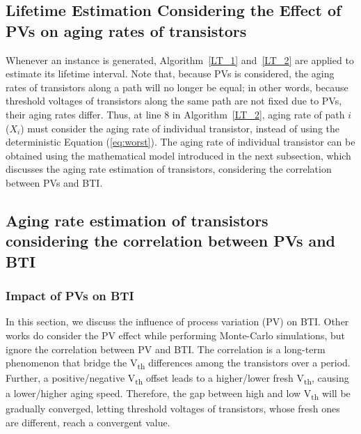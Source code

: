 \subsection{Lifetime Estimation Considering the Effect of PVs on aging rates of transistors}
\label{sec:ins:lt}
Whenever an instance is generated, Algorithm~\ref{LT_1} and~\ref{LT_2} are applied to estimate its lifetime interval. Note that, because PVs is considered, the aging rates of transistors along a path will no longer be equal; in other words, because threshold voltages of transistors along the same path are not fixed due to PVs, their aging rates differ. Thus, at line 8 in Algorithm~\ref{LT_2}, aging rate of path $i$ ($X_{i}$) must consider the aging rate of individual transistor, instead of using the deterministic Equation (\ref{eq:worst}). The aging rate of individual transistor can be obtained using the mathematical model introduced in the next subsection, which discusses the aging rate estimation of transistors, considering the correlation between PVs and BTI.%

\subsection{Aging rate estimation of transistors considering the correlation between PVs and BTI}
\label{sec:ins:cor}
\subsubsection{Impact of PVs on BTI}
\label{sec:correlation}
In this section, we discuss the influence of process variation (PV) on BTI. Other works \cite{kiamehr2016impact}\cite{chen2013novel} do consider the PV effect while performing Monte-Carlo simulations, but ignore the correlation \cite{kiamehr2016impact} between PV and BTI. The correlation is a long-term phenomenon that bridge the V\textsubscript{th} differences among the transistors over a period. Further, a positive/negative V\textsubscript{th} offset leads to a higher/lower fresh V\textsubscript{th}, causing a lower/higher aging speed. Therefore, the gap between high and low V\textsubscript{th} will be gradually converged, letting threshold voltages of transistors, whose fresh ones are different, reach a convergent value.

